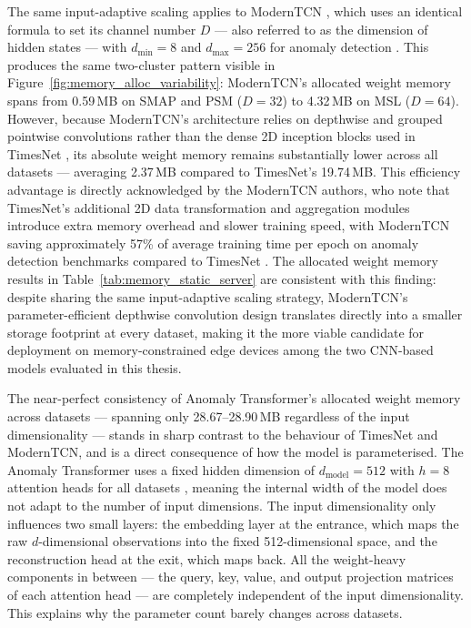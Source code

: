\documentclass[twoside,11pt,openright]{report}
\begin{document}
The same input-adaptive scaling applies to ModernTCN \citep{moderntcn2024}, which 
uses an identical formula to set its channel number $D$ --- also referred to as the 
dimension of hidden states --- with $d_\text{min} = 8$ and $d_\text{max} = 256$ for 
anomaly detection \citep{moderntcn2024}. This produces the same two-cluster pattern 
visible in Figure~\ref{fig:memory_alloc_variability}: ModernTCN's allocated weight 
memory spans from 0.59\,MB on SMAP and PSM ($D = 32$) to 4.32\,MB on MSL ($D = 64$). 
However, because ModernTCN's architecture relies on 
depthwise and grouped pointwise convolutions rather than the dense 2D inception blocks 
used in TimesNet \citep{timesnet2023}, its absolute weight memory remains substantially 
lower across all datasets --- averaging 2.37\,MB compared to TimesNet's 19.74\,MB. 
This efficiency advantage is directly acknowledged by the ModernTCN authors, who note 
that TimesNet's additional 2D data transformation and aggregation modules introduce 
extra memory overhead and slower training speed, with ModernTCN saving approximately 
57\% of average training time per epoch on anomaly detection benchmarks compared to 
TimesNet \citep{moderntcn2024}. The allocated weight memory results in 
Table~\ref{tab:memory_static_server} are consistent with this finding: despite sharing 
the same input-adaptive scaling strategy, ModernTCN's parameter-efficient depthwise 
convolution design translates directly into a smaller storage footprint at every 
dataset, making it the more viable candidate for deployment on memory-constrained 
edge devices among the two CNN-based models evaluated in this thesis.

The near-perfect consistency of Anomaly Transformer's allocated weight memory across 
datasets --- spanning only 28.67--28.90\,MB regardless of the input dimensionality --- 
stands in sharp contrast to the behaviour of TimesNet and ModernTCN, and 
is a direct consequence of how the model is parameterised. The Anomaly Transformer uses 
a fixed hidden dimension of $d_\text{model} = 512$ with 
$h = 8$ attention heads for all datasets \citep{anomalytransformer2022}, meaning the 
internal width of the model does not adapt to the number of input dimensions. The input 
dimensionality only influences two small layers: the embedding layer at the entrance, 
which maps the raw $d$-dimensional observations into the fixed 512-dimensional space, 
and the reconstruction head at the exit, which maps back. All the weight-heavy components 
in between --- the query, key, value, and output projection matrices of each attention 
head --- are completely independent of the input 
dimensionality. This explains why the parameter count barely changes across datasets.
\end{document}
